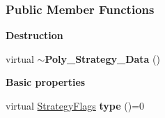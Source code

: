 \subsubsection*{Public Member Functions}
\begin{Indent}\textbf{ Destruction}\par
\begin{DoxyCompactItemize}
\item 
\mbox{\label{group__strategygroup_acdbc88a35a960f6f2934947de32b1f20}} 
virtual {\bfseries $\sim$\+Poly\+\_\+\+Strategy\+\_\+\+Data} ()
\end{DoxyCompactItemize}
\end{Indent}
\begin{Indent}\textbf{ Basic properties}\par
\begin{DoxyCompactItemize}
\item 
\mbox{\label{group__strategygroup_a305ffff282203eaccd7f1709634bc5d4}} 
virtual \hyperlink{group__strategygroup_ga0ee6c8e033547330e6b89929730007f4}{Strategy\+Flags} {\bfseries type} ()=0
\end{DoxyCompactItemize}
\end{Indent}
